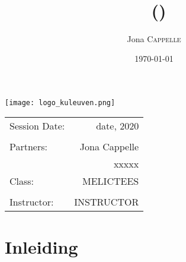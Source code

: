 \documentclass[twoside,a4paper]{article}
\title{\maintitle \\ \course \\{\small\ (\coursenumber)}} %
\author{Jona \textsc{Cappelle}} %
\date{\today} %
\newcommand{\class}{MELICTEES}
\begin{document}
\sloppy %
\begin{titlepage}
\maketitle %

\vfill
\begin{center}
\texttt{[image: logo\_kuleuven.png]} %
\end{center}
\vfill
\vfill
\vfill

\begin{center}
\begin{tabular}{l r}
Session Date: & date, 2020 \\ %
\\
Partners: &  Jona Cappelle\\ %
&  xxxxx\\
Class: & \class \\
\\
Instructor: &  INSTRUCTOR%
\end{tabular}
\end{center}
\vfill
\vfill
\end{titlepage}
\clearpage
\newpage\null\thispagestyle{empty}\newpage %



\restoregeometry%

\tableofcontents
\listoffigures
\clearpage

\section{Inleiding}

\end{document}
